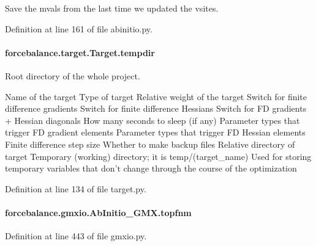 Save the mvals from the last time we updated the vsites. 



Definition at line 161 of file abinitio.\-py.

\hypertarget{classforcebalance_1_1target_1_1Target_aa1f01b5b78db253b5b66384ed11ed193}{
\paragraph[{tempdir}]{\setlength{\rightskip}{0pt plus 5cm}forcebalance.\-target.\-Target.\-tempdir\hspace{0.3cm}{\ttfamily [inherited]}}}\label{classforcebalance_1_1target_1_1Target_aa1f01b5b78db253b5b66384ed11ed193}


Root directory of the whole project. 

Name of the target Type of target Relative weight of the target Switch for finite difference gradients Switch for finite difference Hessians Switch for F\-D gradients + Hessian diagonals How many seconds to sleep (if any) Parameter types that trigger F\-D gradient elements Parameter types that trigger F\-D Hessian elements Finite difference step size Whether to make backup files Relative directory of target Temporary (working) directory; it is temp/(target\-\_\-name) Used for storing temporary variables that don't change through the course of the optimization 

Definition at line 134 of file target.\-py.

\hypertarget{classforcebalance_1_1gmxio_1_1AbInitio__GMX_a885b702e86cd8978df92fbdac8dd36e9}{
\paragraph[{topfnm}]{\setlength{\rightskip}{0pt plus 5cm}forcebalance.\-gmxio.\-Ab\-Initio\-\_\-\-G\-M\-X.\-topfnm}}\label{classforcebalance_1_1gmxio_1_1AbInitio__GMX_a885b702e86cd8978df92fbdac8dd36e9}


Definition at line 443 of file gmxio.\-py.

